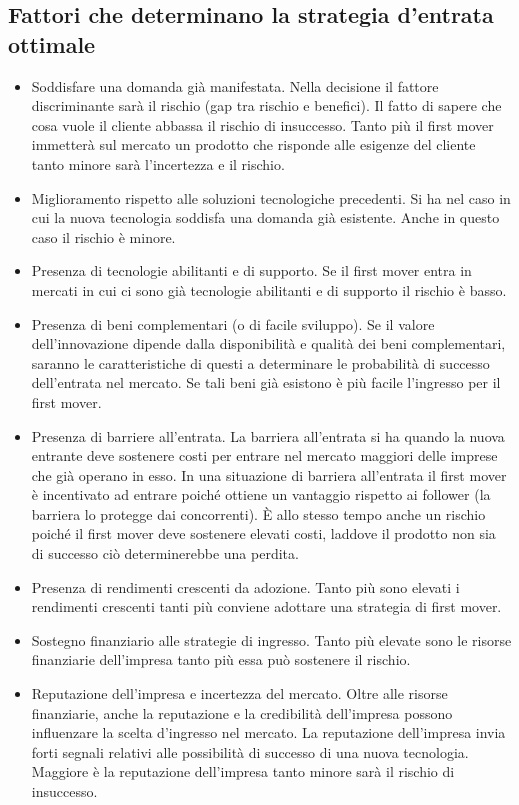 \documentclass{article}
\begin{document}
\subsection{Fattori che determinano la strategia d’entrata ottimale}
\begin{itemize}
	\item Soddisfare una domanda già manifestata.
	Nella decisione il fattore discriminante sarà il rischio (gap tra rischio e benefici). Il fatto di
	sapere che cosa vuole il cliente abbassa il rischio di insuccesso. Tanto più il first mover
	immetterà sul mercato un prodotto che risponde alle esigenze del cliente tanto minore
	sarà l’incertezza e il rischio.
	\item Miglioramento rispetto alle soluzioni tecnologiche precedenti.
	Si ha nel caso in cui la nuova tecnologia soddisfa una domanda già esistente. Anche in
	questo caso il rischio è minore.
	\item Presenza di tecnologie abilitanti e di supporto.
	Se il first mover entra in mercati in cui ci sono già tecnologie abilitanti e di supporto il
	rischio è basso.
	\item Presenza di beni complementari (o di facile sviluppo).
	Se il valore dell’innovazione dipende dalla disponibilità e qualità dei beni complementari,
	saranno le caratteristiche di questi a determinare le probabilità di successo dell’entrata nel
	mercato. Se tali beni già esistono è più facile l’ingresso per il first mover.
\item 	Presenza di barriere all’entrata.
	La barriera all’entrata si ha quando la nuova entrante deve sostenere costi per entrare nel
	mercato maggiori delle imprese che già operano in esso. In una situazione di barriera
	all’entrata il first mover è incentivato ad entrare poiché ottiene un vantaggio rispetto ai
	follower (la barriera lo protegge dai concorrenti). È allo stesso tempo anche un rischio
	poiché il first mover deve sostenere elevati costi, laddove il prodotto non sia di successo ciò
	determinerebbe una perdita.
\item 	Presenza di rendimenti crescenti da adozione.
	Tanto più sono elevati i rendimenti crescenti tanti più conviene adottare una strategia di
	first mover.
\item 	Sostegno finanziario alle strategie di ingresso.
	Tanto più elevate sono le risorse finanziarie dell’impresa tanto più essa può sostenere il
	rischio.
\item 	Reputazione dell’impresa e incertezza del mercato.
	Oltre alle risorse finanziarie, anche la reputazione e la credibilità dell’impresa possono
	influenzare la scelta d’ingresso nel mercato. La reputazione dell’impresa invia forti segnali
	relativi alle possibilità di successo di una nuova tecnologia. Maggiore è la reputazione
	dell’impresa tanto minore sarà il rischio di insuccesso.
\end{itemize}
\end{document}
